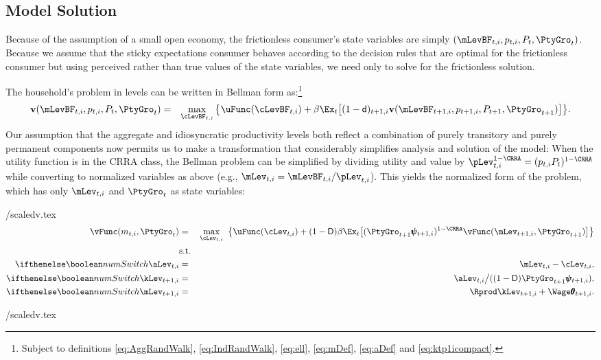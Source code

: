 \subsection{Model Solution}

Because of the assumption of a small open economy, the frictionless consumer's state variables are simply $(\mLevBF_{t,i},p_{t,i},P_t,\PtyGro_t)$.  Because we assume that the sticky expectations consumer behaves according to the decision rules that are optimal for the frictionless consumer but using perceived rather than true values of the state variables, we need only to solve for the frictionless solution.

The household's problem in levels can be written in Bellman form as:\footnote{Subject to definitions \eqref{eq:AggRandWalk}, \eqref{eq:IndRandWalk}, \eqref{eq:ell}, \eqref{eq:mDef}, \eqref{eq:aDef} and \eqref{eq:ktp1icompact}.}
\begin{eqnarray*}
  \textbf{v}(\mLevBF_{t,i},p_{t,i},P_t,\PtyGro_t)  & = &  \max_{\cLevBF_{t,i}}  \big\{ \uFunc(\cLevBF_{t,i}) + \beta \Ex_t \big[\pLives_{t+1,i}\textbf{v}(\mLevBF_{t+1,i},p_{t+1,i},P_{t+1},\PtyGro_{t+1})\big] \big\}. \nonumber
\end{eqnarray*}
Our assumption that the aggregate and idiosyncratic productivity levels both reflect a combination of purely transitory and purely permanent components now permits us to make a transformation that considerably simplifies analysis and solution of the model: When the utility function is in the CRRA class, the Bellman problem can be simplified by dividing utility and value by $\pLev_{t,i}^{1-\CRRA} = (p_{t,i}P_t)^{1-\CRRA}$ while converting to normalized variables as above (e.g., $\mLev_{t,i}=\mLevBF_{t,i}/\pLev_{t,i}$). %
This yields the normalized form of the problem, which has only $\mLev_{t,i}$ and $\PtyGro_t$ as state variables:
\begin{verbatimwrite}{\eq/scaledv.tex}
  \begin{eqnarray}
    \vFunc({m}_{t,i},\PtyGro_t) & = & \max_{\cLev_{t,i}} ~ \big\{ \uFunc(\cLev_{t,i}) + \PLives \beta      \nonumber
                                      \Ex_{t}\big[ (\PtyGro_{t+1} \pmb{\psi}_{t+1,i})^{1-\CRRA}\vFunc(\mLev_{t+1,i},\PtyGro_{t+1})\big] \big\}
                                      \label{eq:scaledv}
    \\  & \mbox{s.t.} & 
    \\ \ifnumSw  \aLev_{t,i}   & = & \mLev_{t,i} - \cLev_{t,i}, \nonumber
    \\ \ifnumSw  \kLev_{t+1,i} & = & \aLev_{t,i} \big/( \PLives \PtyGro_{t+1} \pmb{\psi}_{t+1,i} ),  \nonumber
    \\ \ifnumSw  \mLev_{t+1,i} & = & \Rprod \kLev_{t+1,i} + \Wage \pmb{\theta}_{t+1,i}.  \nonumber
  \end{eqnarray}
\end{verbatimwrite}
 \eq/scaledv.tex

